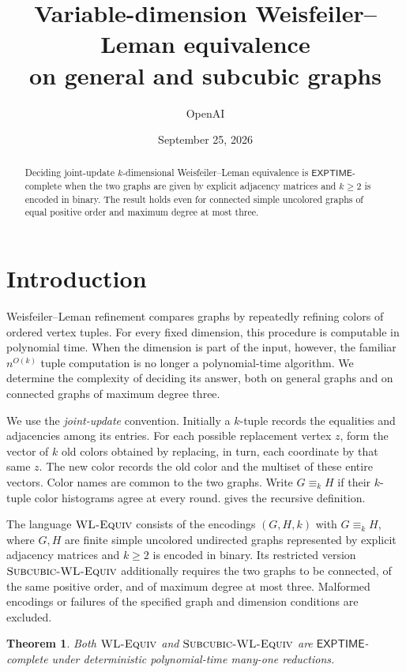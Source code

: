 \documentclass[11pt]{article}
\title{Variable-dimension Weisfeiler--Leman equivalence\\on general and subcubic graphs}
\author{OpenAI}
\date{September 25, 2026}
\newtheorem{theorem}{Theorem}[section]
\theoremstyle{definition}
\begin{document}
\begin{abstract}
Deciding joint-update \(k\)-dimensional Weisfeiler--Leman equivalence is
\(\mathsf{EXPTIME}\)-complete when the two graphs are given by explicit adjacency
matrices and \(k\ge2\) is encoded in binary. The result holds even for
connected simple uncolored graphs of equal positive order and maximum
degree at most three.
\end{abstract}
{\footnotesize\tableofcontents}
\section{Introduction}\label{sec:introduction}

Weisfeiler--Leman refinement compares graphs by repeatedly refining colors
of ordered vertex tuples. For every fixed dimension, this procedure is
computable in polynomial time. When the dimension is part of the input,
however, the familiar \(n^{O(k)}\) tuple computation is no longer a
polynomial-time algorithm. We determine the complexity of deciding its
answer, both on general graphs and on connected graphs of maximum degree
three.

We use the \emph{joint-update} convention. Initially a \(k\)-tuple records
the equalities and adjacencies among its entries. For each possible
replacement vertex \(z\), form the vector of \(k\) old colors obtained by
replacing, in turn, each coordinate by that same \(z\). The new color
records the old color and the multiset of these entire vectors. Color
names are common to the two graphs. Write \(G\equiv_k H\) if their
\(k\)-tuple color histograms agree at every round.
 gives the recursive definition.

The language \(\textnormal{\textsc{WL-Equiv}}\) consists of the encodings \((G,H,k)\) with
\(G\equiv_k H\), where \(G,H\) are finite simple uncolored undirected
graphs represented by explicit adjacency matrices and \(k\ge2\) is
encoded in binary. Its restricted version \(\textnormal{\textsc{Subcubic-WL-Equiv}}\) additionally
requires the two graphs to be connected, of the same positive order,
and of maximum degree at most three. Malformed encodings or failures
of the specified graph and dimension conditions are excluded.

\begin{theorem}\label{thm:main}
Both \(\textnormal{\textsc{WL-Equiv}}\) and \(\textnormal{\textsc{Subcubic-WL-Equiv}}\) are \(\mathsf{EXPTIME}\)-complete under deterministic
polynomial-time many-one reductions.
\end{theorem}
\end{document}
